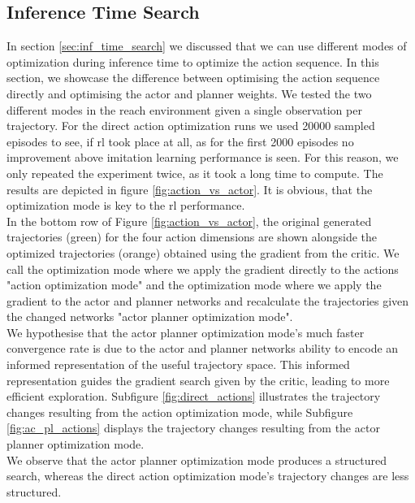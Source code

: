 \subsection{Inference Time Search}
\label{ref:com_opt_modes}
In section \ref{sec:inf_time_search} we discussed that we can use different modes of optimization during inference time to optimize the action sequence. In this section, 
we showcase the difference between optimising the action sequence directly and optimising the actor and planner weights. We tested the two different 
modes in the reach environment given a single observation per trajectory. For the direct 
action optimization runs we used 20000 sampled episodes to see, if \ac{rl} took place at all, as for the first 2000 episodes no improvement above 
imitation learning performance is seen. For this reason, we only repeated the experiment twice, as it took a long time to compute. The results are depicted in figure 
\ref{fig:action_vs_actor}. It is obvious, that the optimization mode is key to the \ac{rl} performance. \\

In the bottom row of Figure \ref{fig:action_vs_actor}, the original generated trajectories (green) for the four action dimensions 
are shown alongside the optimized trajectories (orange) obtained using the gradient from the critic. We call the optimization mode 
where we apply the gradient directly to the actions "action optimization mode" and the optimization mode where we apply 
the gradient to the actor and planner networks and recalculate the trajectories given the changed networks "actor planner 
optimization mode".\\

We hypothesise that 
the actor planner optimization mode's much faster convergence rate is due to the actor and planner networks ability to 
encode an informed representation of the useful trajectory space. This informed representation guides the gradient search 
given by the critic, leading to more efficient exploration. Subfigure \ref{fig:direct_actions} illustrates the trajectory 
changes resulting from the action optimization mode, while Subfigure \ref{fig:ac_pl_actions} displays 
the trajectory changes resulting from the actor planner optimization mode. \\

We observe that the actor planner 
optimization mode produces a structured search, whereas the direct action optimization mode's trajectory changes are less structured.\\


